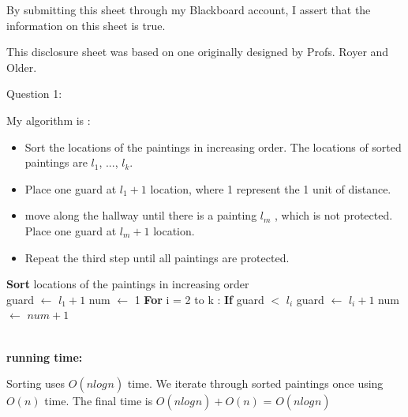 \documentclass[12pt]{article}
\begin{document}
By submitting this sheet through my Blackboard account, I assert that the information on this sheet is true.


\hfill {\tiny This disclosure sheet was based on one originally designed
  by
  Profs. Royer and Older.}


\pagebreak
\noindent
\large Question 1: \vspace{5mm} \par
\normalsize 
My algorithm is :
\begin{itemize}
  \item Sort the locations of the paintings in increasing order. The locations of sorted paintings are $l_1$, ..., $l_k$.
  \item	Place one guard at $l_1 + 1$ location, where 1 represent the 1 unit of distance. 
  \item move along the hallway until there is a painting $l_m$ , which is not protected. Place one guard at $l_m + 1$ location.
  \item Repeat the third step until all paintings are protected. 
\end{itemize}

\begin{algorithm}
\begin{algorithmic}
\State \textbf{Sort} locations of the paintings in increasing order \\
\State guard $\leftarrow$ $l_1 + 1$
\State num $\leftarrow$ 1
\State \hspace{0.4cm} \textbf{For} i = 2 to k :
\State \hspace{0.8cm} \textbf{If} guard $<$ $l_i$
\State \hspace{1.2cm} \textbf{} guard $\leftarrow$ $l_i + 1$
\State \hspace{1.2cm} \textbf{} num $\leftarrow$ $num + 1$
\end{algorithmic}
\end{algorithm}
\noindent \\
\textbf{running time:} \par
Sorting uses $O(nlog_{}{n})$ time. We iterate through sorted paintings once using $O(n)$ time.
The final time is $O(nlog_{}{n}) + O(n)$ = $O(nlog_{}{n})$
\end{document}
